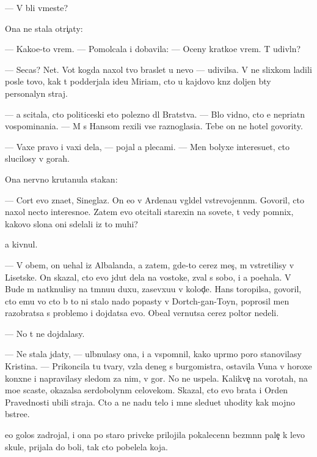 \documentclass[10pt]{book}
\begin{document}
— V{\yi} b{\yi}li vmeste?

Ona ne stala otri{\c}aty:

— Kako{\y}e-to vrem{\ia}. — Pomolcala i dobavila: — Oceny kratko{\y}e vrem{\ia}. T{\yi} udivl{\e}n?

— Se{\y}cas? Net. Vot kogda naxol tvo{\y} braslet u nevo — udivilsa. V{\yi} ne slixkom ladili posle tovo, kak t{\yi} podderjala ide{\y}u Miriam, cto u kajdovo kn{\ia}z{\ia} doljen b{\yi}ty personalyn{\yi}{\y} straj.

— {\Y}a scitala, cto politiceski eto polezno dl{\ia} Bratstva. — B{\yi}lo vidno, cto {\y}e{\y} nepri{\y}atn{\yi} vospominani{\y}a. — M{\yi} s Hansom rexili vse raznoglasi{\y}a. Tebe on ne hotel govority.

— Vaxe pravo i vaxi dela, — pojal {\y}a plecami. — Men{\ia} bolyxe interesu{\y}et, cto slucilosy v gorah.

Ona nervno krutanula stakan:

— Cort {\y}evo zna{\y}et, Sineglaz{\yi}{\y}. On {\y}e{\x}o v Ardenau v{\yi}gl{\ia}del vstrevojenn{\yi}m. Govoril, cto naxol necto interesno{\y}e. Zatem {\y}evo otcitali stare{\y}xin{\yi} na sovete, t{\yi} vedy pomnix, kakovo slona oni sdelali iz to{\y} muhi?

{\Y}a kivnul.

— V ob{\x}em, on u{\y}ehal iz Albalanda, a zatem, gde-to cerez mes{\ia}{\c}, m{\yi} vstretilisy v Lisetske. On skazal, cto {\y}evo jdut dela na vostoke, zval s sobo{\y}, i {\y}a po{\y}ehala. V Bude m{\yi} natknulisy na t{\e}mnu{\y}u duxu, zasevxu{\y}u v kolod{\c}e. Hans toropilsa, govoril, cto {\y}emu vo cto b{\yi} to ni stalo nado popasty v Dortch-gan-Toyn, poprosil men{\ia} razobratsa s problemo{\y} i dojdatsa {\y}evo. Obe{\x}al vernutsa cerez poltor{\yi} nedeli.

— No t{\yi} ne dojdalasy.

— Ne stala jdaty, — ul{\yi}bnulasy ona, i {\y}a vspomnil, kako{\y} upr{\ia}mo{\y} poro{\y} stanovilasy Kristina. — Prikoncila tu tvary, vz{\ia}la deneg s burgomistra, ostavila V{\y}una v horoxe{\y} kon{\iu}xne i napravilasy sledom za nim, v gor{\yi}. No ne uspela. Kalikve{\c} na vorotah, na mo{\y}e scast{\y}e, okazalsa serdobolyn{\yi}m celovekom. Skazal, cto {\y}evo brat{\y}a i Orden Pravednosti ubili straja. Cto {\y}a ne na{\y}du telo i mne sledu{\y}et uhodity kak mojno b{\yi}stre{\y}e.

{\Y}e{\y}o golos zadrojal, i ona po staro{\y} priv{\yi}cke prilojila pokalecenn{\yi}{\y} bez{\yi}m{\ia}nn{\yi}{\y} pale{\c} k levo{\y} skule, prijala do boli, tak cto pobelela koja.
\end{document}
